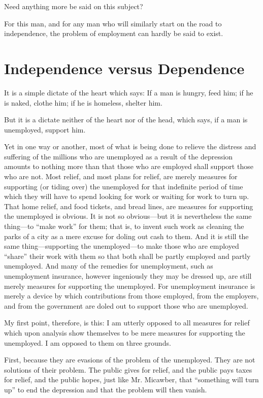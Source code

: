 \documentclass{book}
\begin{document}
Need anything more be said on this subject?

For this man, and for any man who will similarly start on the road to independence, the problem of employment can hardly be said to exist.

\chapter{Independence versus Dependence}
\label{chapter-10}
It is a simple dictate of the heart which says: If a man is hungry, feed him; if he is naked, clothe him; if he is homeless, shelter him.

But it is a dictate neither of the heart nor of the head, which says, if a man is unemployed, support him.

Yet in one way or another, most of what is being done to relieve the distress and suffering of the millions who are unemployed as a result of the depression amounts to nothing more than that those who are employed shall support those who are not. Most relief, and most plans for relief, are merely measures for supporting (or tiding over) the unemployed for that indefinite period of time which they will have to spend looking for work or waiting for work to turn up. That home relief, and food tickets, and bread lines, are measures for supporting the unemployed is obvious. It is not so obvious—but it is nevertheless the same thing—to “make work” for them; that is, to invent such work as cleaning the parks of a city as a mere excuse for doling out cash to them. And it is still the same thing—supporting the unemployed—to make those who are employed “share” their work with them so that both shall be partly employed and partly unemployed. And many of the remedies for unemployment, such as unemployment insurance, however ingeniously they may be dressed up, are still merely measures for supporting the unemployed. For unemployment insurance is merely a device by which contributions from those employed, from the employers, and from the government are doled out to support those who are unemployed.

My first point, therefore, is this: I am utterly opposed to all measures for relief which upon analysis show themselves to be mere measures for supporting the unemployed. I am opposed to them on three grounds.

First, because they are evasions of the problem of the unemployed. They are not solutions of their problem. The public gives for relief, and the public pays taxes for relief, and the public hopes, just like Mr. Micawber, that “something will turn up” to end the depression and that the problem will then vanish.
\end{document}
